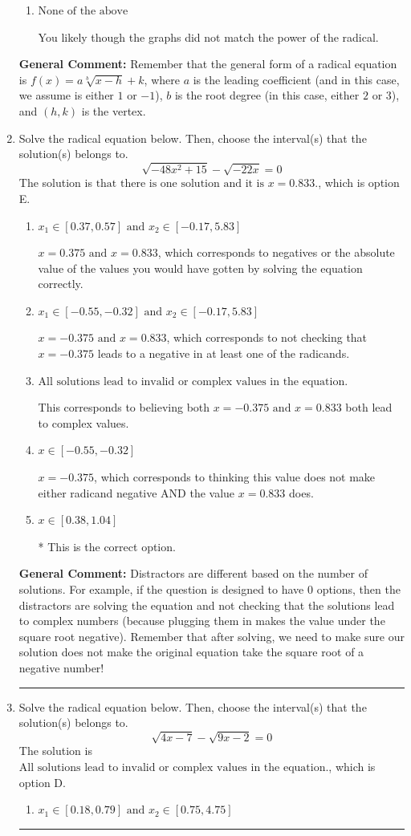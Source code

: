 \documentclass{extbook}[14pt]
\newcommand{\litem}[1]{\item #1

\rule{\textwidth}{0.4pt}}
\begin{document}
\begin{enumerate}
{\begin{enumerate}[label=\Alph*.]
This corresponds to the correct coefficient and switching the $x$-value of the vertex with the root degree as $3$.
\item \( \text{None of the above} \)

You likely though the graphs did not match the power of the radical.
\end{enumerate}

\textbf{General Comment:} Remember that the general form of a radical equation is $ f(x) = a \sqrt[b]{x - h} + k$, where $a$ is the leading coefficient (and in this case, we assume is either $1$ or $-1$), $b$ is the root degree (in this case, either $2$ or $3$), and $(h, k)$ is the vertex.
}
\litem{
Solve the radical equation below. Then, choose the interval(s) that the solution(s) belongs to.
\[ \sqrt{-48 x^2 + 15} - \sqrt{-22 x} = 0 \]The solution is \( \text{that there is one solution and it is } x = 0.833. \), which is option E.\begin{enumerate}[label=\Alph*.]
\item \( x_1 \in [0.37, 0.57] \text{ and } x_2 \in [-0.17,5.83] \)

$x = 0.375 \text{ and } x = 0.833$, which corresponds to negatives or the absolute value of the values you would have gotten by solving the equation correctly.
\item \( x_1 \in [-0.55, -0.32] \text{ and } x_2 \in [-0.17,5.83] \)

$x = -0.375 \text{ and } x = 0.833$, which corresponds to not checking that $x = -0.375$ leads to a negative in at least one of the radicands.
\item \( \text{All solutions lead to invalid or complex values in the equation.} \)

This corresponds to believing both $x = -0.375 \text{ and } x = 0.833$ both lead to complex values.
\item \( x \in [-0.55,-0.32] \)

$x = -0.375$, which corresponds to thinking this value does not make either radicand negative AND the value $x = 0.833$ does.
\item \( x \in [0.38,1.04] \)

* This is the correct option.
\end{enumerate}

\textbf{General Comment:} Distractors are different based on the number of solutions. For example, if the question is designed to have 0 options, then the distractors are solving the equation and not checking that the solutions lead to complex numbers (because plugging them in makes the value under the square root negative). Remember that after solving, we need to make sure our solution does not make the original equation take the square root of a negative number!
}
\litem{
Solve the radical equation below. Then, choose the interval(s) that the solution(s) belongs to.
\[ \sqrt{4 x - 7} - \sqrt{9 x - 2} = 0 \]The solution is \( \text{All solutions lead to invalid or complex values in the equation.} \), which is option D.\begin{enumerate}[label=\Alph*.]
\item \( x_1 \in [0.18, 0.79] \text{ and } x_2 \in [0.75,4.75] \)


\end{enumerate}}
\end{enumerate}
\end{document}
